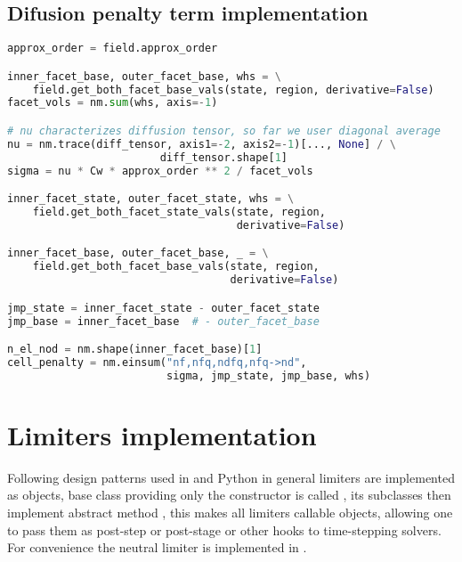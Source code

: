 \subsection{Difusion penalty term implementation}
\label{se:diff_penal_term_imp}
\setcounter{lstannotation}{0}
\begin{lstlisting}[language=Python, caption=Computation of penalty cell 
fluxes]
approx_order = field.approx_order

inner_facet_base, outer_facet_base, whs = \
    field.get_both_facet_base_vals(state, region, derivative=False)
facet_vols = nm.sum(whs, axis=-1)

# nu characterizes diffusion tensor, so far we user diagonal average
nu = nm.trace(diff_tensor, axis1=-2, axis2=-1)[..., None] / \
                        diff_tensor.shape[1]
sigma = nu * Cw * approx_order ** 2 / facet_vols

inner_facet_state, outer_facet_state, whs = \
    field.get_both_facet_state_vals(state, region, 
                                    derivative=False)

inner_facet_base, outer_facet_base, _ = \
    field.get_both_facet_base_vals(state, region, 
                                   derivative=False)

jmp_state = inner_facet_state - outer_facet_state
jmp_base = inner_facet_base  # - outer_facet_base

n_el_nod = nm.shape(inner_facet_base)[1]
cell_penalty = nm.einsum("nf,nfq,ndfq,nfq->nd",
                         sigma, jmp_state, jmp_base, whs)

\end{lstlisting}

\section{Limiters implementation}
Following design patterns used in \sfepy{} and Python in general limiters are 
implemented as objects, base class providing only the constructor is called , its 
subclasses then implement abstract method , this makes all limiters callable 
objects, allowing one to pass them as post-step or post-stage or other hooks to time-stepping 
solvers. For convenience the neutral limiter is implemented in .

